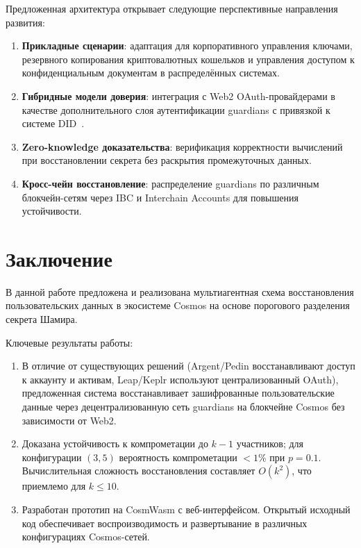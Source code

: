 Предложенная архитектура открывает следующие перспективные направления развития:

\begin{enumerate}
\item
\textbf{Прикладные сценарии}: адаптация для корпоративного управления ключами, резервного копирования криптовалютных кошельков и управления доступом к конфиденциальным документам в распределённых системах.

\item
\textbf{Гибридные модели доверия}: интеграция с Web2 OAuth-провайдерами в качестве дополнительного слоя аутентификации guardians с привязкой к системе DID~\cite{s16}.

\item
\textbf{Zero-knowledge доказательства}: верификация корректности вычислений при восстановлении секрета без раскрытия промежуточных данных.

\item
\textbf{Кросс-чейн восстановление}: распределение guardians по различным блокчейн-сетям через IBC и Interchain Accounts для повышения устойчивости.
\end{enumerate}

\section{Заключение}

В данной работе предложена и реализована мультиагентная схема восстановления пользовательских данных в экосистеме Cosmos на основе порогового разделения секрета Шамира.

Ключевые результаты работы:

\begin{enumerate}
\item
В отличие от существующих решений (Argent/Pedin восстанавливают доступ к аккаунту и активам, Leap/Keplr используют централизованный OAuth), предложенная система восстанавливает зашифрованные пользовательские данные через децентрализованную сеть guardians на блокчейне Cosmos без зависимости от Web2.

\item
Доказана устойчивость к компрометации до $k-1$ участников; для конфигурации $(3,5)$ вероятность компрометации $<1\%$ при $p=0.1$. Вычислительная сложность восстановления составляет $O(k^2)$, что приемлемо для $k \leq 10$.

\item
Разработан прототип на CosmWasm с веб-интерфейсом. Открытый исходный код обеспечивает воспроизводимость и развертывание в различных конфигурациях Cosmos-сетей.
\end{enumerate}

